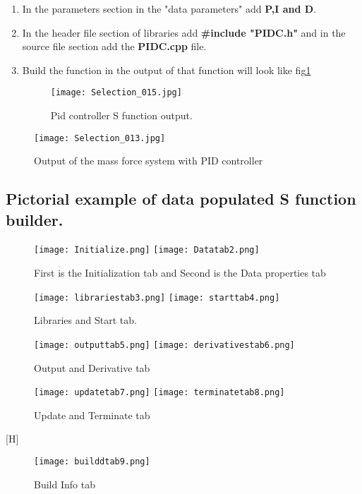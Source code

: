 \documentclass{article}
\begin{document}
\begin{enumerate}
\item In the parameters section in the "data parameters" add \textbf{P,I and D}.
\item In the header file section of libraries add \textbf{#include "PIDC.h"} and in the source file section add the \textbf{PIDC.cpp} file.
\item Build the function in the output of that function will look like fig\ref{fig:pid_builder}
\begin{figure}[H]
    \centering
    \texttt{[image: Selection\_015.jpg]}
    \caption{Pid controller S function output.}
    \label{fig:pid_builder}
\end{figure}
\end{enumerate}
\begin{figure}[H]
    \centering
    \texttt{[image: Selection\_013.jpg]}
    \caption{Output of the mass force system with PID controller}
    \label{fig:output_builder}
\end{figure}
\subsection*{Pictorial example of data populated S function builder.}
\begin{figure}[H]
    \centering
    \texttt{[image: Initialize.png]}
    \texttt{[image: Datatab2.png]}
    \caption{First is the Initialization tab and Second is the Data properties tab}
    \label{fig:ex1}
\end{figure}
\begin{figure}[H]
    \centering
    \texttt{[image: librariestab3.png]}
    \texttt{[image: starttab4.png]}
    \caption{Libraries and Start tab.}
    \label{fig:ex2}
\end{figure}
\begin{figure}[H]
    \centering
    \texttt{[image: outputtab5.png]}
    \texttt{[image: derivativestab6.png]}
    \caption{Output and Derivative tab}
    \label{fig:ex3}
\end{figure}
\begin{figure}[H]
    \centering
    \texttt{[image: updatetab7.png]}
    \texttt{[image: terminatetab8.png]}
    \caption{Update and Terminate tab}
    \label{fig:my_label}
\end{figure}[H]
\begin{figure}
    \centering
    \texttt{[image: builddtab9.png]}
    \caption{Build Info tab}
    \label{fig:my_label}
\end{figure}
\newpage
\end{document}
